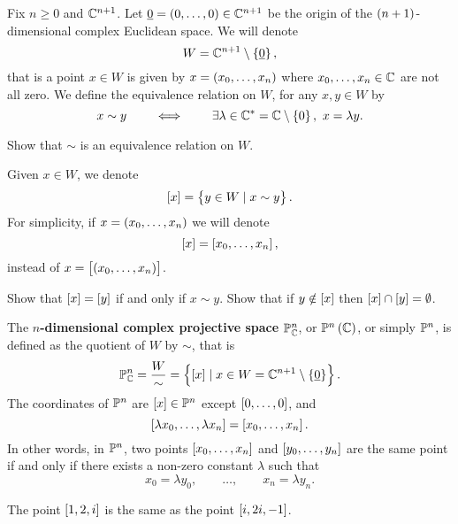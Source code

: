 \pagebreak

\begin{notation}
Fix $ n \ge 0 $ and $ \C^{n + 1} $. Let $ \underline{0} = \br{0, \dots, 0} \in \C^{n + 1} $ be the origin of the $ \br{n + 1} $-dimensional complex Euclidean space. We will denote
$$ W = \C^{n + 1} \setminus \cbr{\underline{0}}, $$
that is a point $ x \in W $ is given by $ x = \br{x_0, \dots, x_n} $ where $ x_0, \dots, x_n \in \C $ are not all zero. We define the equivalence relation on $ W $, for any $ x, y \in W $ by
$$ x \sim y \qquad \iff \qquad \exists \lambda \in \C^* = \C \setminus \cbr{0}, \ x = \lambda y. $$
\end{notation}

\begin{exercise}
Show that $ \sim $ is an equivalence relation on $ W $.
\end{exercise}

\begin{notation}
Given $ x \in W $, we denote
$$ \sbr{x} = \cbr{y \in W \mid x \sim y}. $$
For simplicity, if $ x = \br{x_0, \dots, x_n} $ we will denote
$$ \sbr{x} = \sbr{x_0, \dots, x_n}, $$
instead of $ x = \sbr{\br{x_0, \dots, x_n}} $.
\end{notation}

\begin{exercise}
Show that $ \sbr{x} = \sbr{y} $ if and only if $ x \sim y $. Show that if $ y \notin \sbr{x} $ then $ \sbr{x} \cap \sbr{y} = \emptyset $.
\end{exercise}

\begin{definition}
The \textbf{$ n $-dimensional complex projective space} $ \P_\C^n $, or $ \P^n\br{\C} $, or simply $ \P^n $, is defined as the quotient of $ W $ by $ \sim $, that is
$$ \P_\C^n = \dfrac{W}{\sim} = \cbr{\sbr{x} \mid x \in W = \C^{n + 1} \setminus \cbr{\underline{0}}}. $$
The coordinates of $ \P^n $ are $ \sbr{x} \in \P^n $ except $ \sbr{0, \dots, 0} $, and
$$ \sbr{\lambda x_0, \dots, \lambda x_n} = \sbr{x_0, \dots, x_n}. $$
In other words, in $ \P^n $, two points $ \sbr{x_0, \dots, x_n} $ and $ \sbr{y_0, \dots, y_n} $ are the same point if and only if there exists a non-zero constant $ \lambda $ such that
$$ x_0 = \lambda y_0, \qquad \dots, \qquad x_n = \lambda y_n. $$
\end{definition}

\begin{example}
The point $ \sbr{1, 2, i} $ is the same as the point $ \sbr{i, 2i, -1} $.
\end{example}

